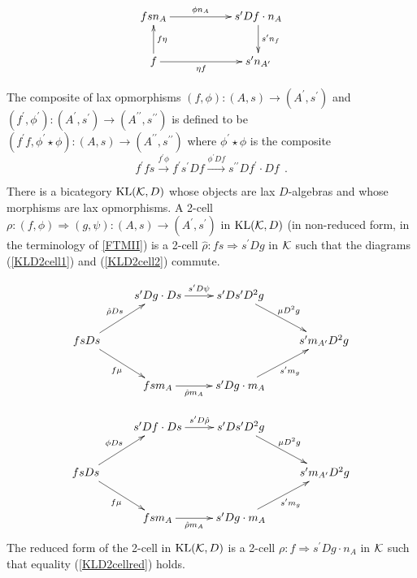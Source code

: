 \documentclass[a4paper,10pt]{article}
\newcommand{\bk}{{\cal{K}}}
\numberwithin{equation}{section}
\begin{document}
\begin{equation} \label{laxopmor2}
\xymatrix{
fsn_A \ar[rr]^-{\phi n_A}  && s^{\prime} Df \cdot n_A \ar[d]^-{s^{\prime} n_f} \\
f \ar[rr]_-{\eta f} \ar[u]_-{f \eta} && s^{\prime} n_{A^{\prime}}}
\end{equation}

\noindent The composite of lax opmorphisms 
$(f,\phi):(A,s) \longrightarrow (A^{\prime },s^{\prime })$ 
and $(f^{\prime },\phi ^{\prime }):(A^{\prime },s^{\prime }) \longrightarrow (A^{\prime\prime },s^{\prime\prime })$ 
is defined to be $(f^{\prime }f,\phi ^{\prime } \star \phi):(A,s) \longrightarrow (A^{\prime\prime },s^{\prime\prime })$ 
where $\phi ^{\prime } \star \phi$ is the composite 
\begin{equation}
f^{\prime} f s \overset{f^{\prime} \phi} \longrightarrow f^{\prime}
s^{\prime} Df \overset{\phi^{\prime} Df} \longrightarrow
s^{{\prime\prime}} Df^{\prime} \cdot Df \ \ .
\end{equation}
 
There is a bicategory $\mathrm{KL}(\bk,D)$ whose objects are lax $D$-algebras and whose morphisms are lax opmorphisms. A 2-cell $\rho : (f, \phi)\Longrightarrow (g, \psi) : (A,s) \longrightarrow (A^{\prime},s^{\prime})$ in $\mathrm{KL}(\bk,D)$ (in non-reduced form, in the terminology of \ref{FTMII}) is a 2-cell $\hat{\rho} : f s \Longrightarrow s^{\prime} Dg$ in $\bk$ such that the diagrams (\ref{KLD2cell1}) and (\ref{KLD2cell2}) commute.  

\begin{equation}\label{KLD2cell1}
\xymatrix{
& s^{\prime} Dg \cdot Ds \ar[r]^-{s^{\prime} D\psi} & s^{\prime} Ds^{\prime} D^{2} g \ar[rd]^-{\mu D^{2} g} & \\
 fsDs \ar[ru]^-{\hat{\rho} Ds} \ar[rd]_-{f \mu} & & & s^{\prime} m_{A^{\prime}} D^{2} g\\
& fsm_A \ar[r]_-{\hat{\rho} m_A} & s^{\prime} Dg \cdot m_A \ar[ru]_-{s^{\prime} m_g}  &}
\end{equation}

\begin{equation}\label{KLD2cell2}
\xymatrix{
& s^{\prime} Df \cdot Ds \ar[r]^-{s^{\prime} D \hat{\rho}} & s^{\prime} Ds^{\prime} D^{2} g \ar[rd]^-{\mu D^{2} g} & \\
 fsDs \ar[ru]^-{\phi Ds} \ar[rd]_-{f \mu} & & & s^{\prime} m_{A^{\prime}} D^{2} g\\
& fsm_A \ar[r]_-{\hat{\rho} m_A} & s^{\prime} Dg \cdot m_A \ar[ru]_-{s^{\prime} m_g}  &}
\end{equation}
The reduced form of the 2-cell in $\mathrm{KL}(\bk,D)$ is a 2-cell $\rho : f  \Longrightarrow s^{\prime} Dg \cdot n_A$ in $\bk$ such that equality (\ref{KLD2cellred}) holds. 
\end{document}
